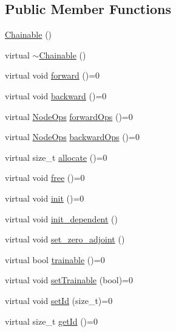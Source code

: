 \subsection*{Public Member Functions}
\begin{DoxyCompactItemize}
\item 
\hyperlink{classmarian_1_1Chainable_a7dca365afdad93e9f14dd3a9eb448a67}{Chainable} ()
\item 
virtual \hyperlink{classmarian_1_1Chainable_a97748d5fa4766b4006be2e00509f9d69}{$\sim$\+Chainable} ()
\item 
virtual void \hyperlink{classmarian_1_1Chainable_ae34ca176aa8332060971e48e5924021d}{forward} ()=0
\item 
virtual void \hyperlink{classmarian_1_1Chainable_ac378f88a43e622f8ebe915e07a6e3afd}{backward} ()=0
\item 
virtual \hyperlink{namespacemarian_a4956376218cc236016c20bc4071470da}{Node\+Ops} \hyperlink{classmarian_1_1Chainable_ad384c497e09e7af6a5a2e5b660a587a1}{forward\+Ops} ()=0
\item 
virtual \hyperlink{namespacemarian_a4956376218cc236016c20bc4071470da}{Node\+Ops} \hyperlink{classmarian_1_1Chainable_a309d5314142f2a3bbdb555c631b9ff81}{backward\+Ops} ()=0
\item 
virtual size\+\_\+t \hyperlink{classmarian_1_1Chainable_abfe36e67806df6681bdcd7bf81cbab16}{allocate} ()=0
\item 
virtual void \hyperlink{classmarian_1_1Chainable_a0b0a98056948c3cb92e1bad73f32781c}{free} ()=0
\item 
virtual void \hyperlink{classmarian_1_1Chainable_a38fc006b882be3f26352a6b6364e60e7}{init} ()=0
\item 
virtual void \hyperlink{classmarian_1_1Chainable_a489e63a97b6940ab1d7065e2b4f935f2}{init\+\_\+dependent} ()
\item 
virtual void \hyperlink{classmarian_1_1Chainable_ab8d92dd0145cc2fdf9c634f3493afa3e}{set\+\_\+zero\+\_\+adjoint} ()
\item 
virtual bool \hyperlink{classmarian_1_1Chainable_aaec9da795a462f3ed88325769d8c238a}{trainable} ()=0
\item 
virtual void \hyperlink{classmarian_1_1Chainable_a0af1d5f65be7f857b18370dfa1df1638}{set\+Trainable} (bool)=0
\item 
virtual void \hyperlink{classmarian_1_1Chainable_a394a7e3f35fc90a7d9e717c7512fd2f1}{set\+Id} (size\+\_\+t)=0
\item 
virtual size\+\_\+t \hyperlink{classmarian_1_1Chainable_a2dff8542fdaf06b18dcf26f5a5834621}{get\+Id} ()=0

\end{DoxyCompactItemize}

